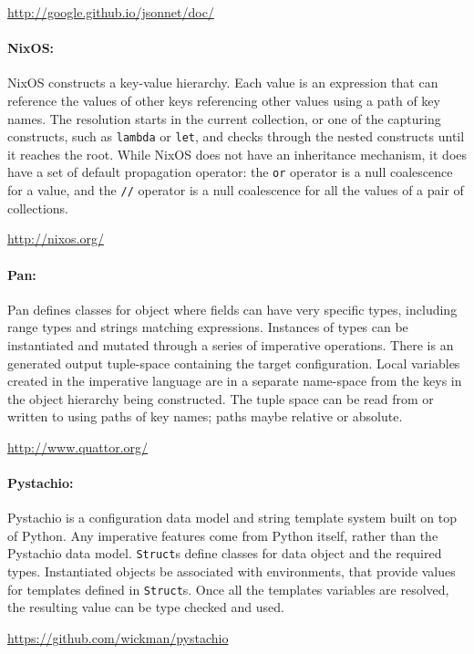 \documentclass[letterpaper,twocolumn,10pt]{article}
\begin{document}
\noindent \url{http://google.github.io/jsonnet/doc/}

\paragraph{NixOS:}
NixOS constructs a key-value hierarchy. Each value is an expression that can reference the values of other keys referencing other values using a path of key names. The resolution starts in the current collection, or one of the capturing constructs, such as \texttt{lambda} or \texttt{let}, and checks through the nested constructs until it reaches the root. While NixOS does not have an inheritance mechanism, it does have a set of default propagation operator: the \texttt{or} operator is a null coalescence for a value, and the \texttt{//} operator is a null coalescence for all the values of a pair of collections.

\noindent\url{http://nixos.org/}

\paragraph{Pan:}
Pan defines classes for object where fields can have very specific types, including range types and strings matching expressions. Instances of types can be instantiated and mutated through a series of imperative operations. There is an generated output tuple-space containing the target configuration. Local variables created in the imperative language are in a separate name-space from the keys in the object hierarchy being constructed. The tuple space can be read from or written to using paths of key names; paths maybe relative or absolute.

\noindent \url{http://www.quattor.org/}

\paragraph{Pystachio:}
Pystachio is a configuration data model and string template system built on top of Python. Any imperative features come from Python itself, rather than the Pystachio data model. \texttt{Struct}s define classes for data object and the required types. Instantiated objects be associated with environments, that provide values for templates defined in \texttt{Struct}s. Once all the templates variables are resolved, the resulting value can be type checked and used.

\noindent \url{https://github.com/wickman/pystachio}
\end{document}

